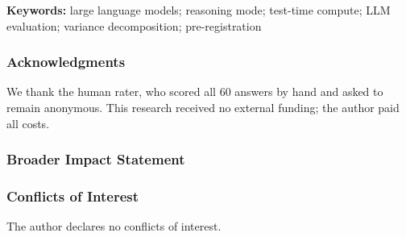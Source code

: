 \documentclass[10pt]{article}
\author{\name Roshan Aryal \email roshanaryaal@gmail.com \\
      \addr Independent Researcher, Auckland, New Zealand}
\begin{document}
\maketitle

\noindent\textbf{Keywords:} large language models; reasoning mode; test-time compute; LLM
evaluation; variance decomposition; pre-registration



\subsubsection*{Acknowledgments}
We thank the human rater, who scored all 60 answers by hand and asked to remain anonymous.
This research received no external funding; the author paid all costs.

\subsubsection*{Broader Impact Statement}


\subsubsection*{Conflicts of Interest}
The author declares no conflicts of interest.




\appendix

\end{document}
